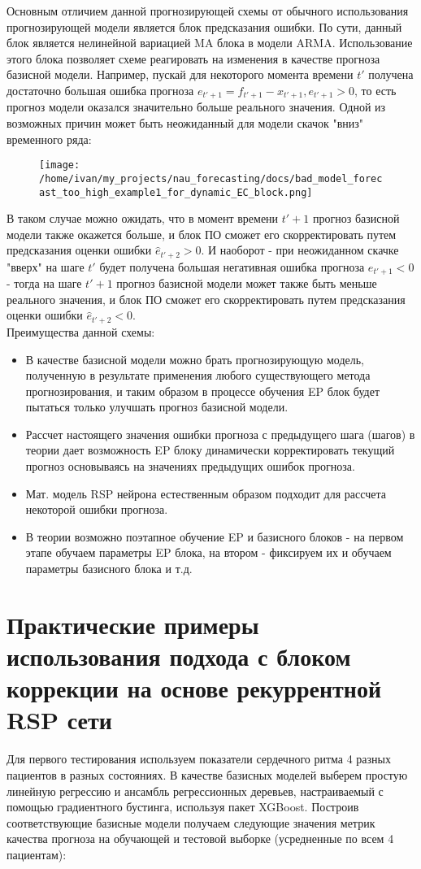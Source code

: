 \documentclass[11pt]{article}
\begin{document}
Основным отличием данной прогнозирующей схемы от обычного использования прогнозирующей модели является блок предсказания ошибки. По сути, данный блок является нелинейной вариацией MA блока в модели ARMA. Использование этого блока позволяет схеме реагировать на изменения в качестве прогноза базисной модели. Например, пускай для некоторого момента времени $t'$ получена достаточно большая ошибка прогноза $ e_{t'+1} = f_{t'+1} - x_{t'+1}, e_{t'+1} > 0 $, то есть прогноз модели оказался значительно больше реального значения. Одной из возможных причин может быть неожиданный для модели скачок "вниз" временного ряда:
\begin{figure}[H]
\centering
\texttt{[image: /home/ivan/my\_projects/nau\_forecasting/docs/bad\_model\_forecast\_too\_high\_example1\_for\_dynamic\_EC\_block.png]}
\label{}
\end{figure}

В таком случае можно ожидать, что в момент времени $t'+1$ прогноз базисной модели также окажется больше, и блок ПО сможет его скорректировать путем предсказания оценки ошибки $ \hat{e}_{t'+2} > 0$. И наоборот - при неожиданном скачке "вверх" на шаге $t'$ будет получена большая негативная ошибка прогноза $ e_{t'+1} < 0 $ - тогда на шаге $t'+1$ прогноз базисной модели может также быть меньше реального значения, и блок ПО сможет его скорректировать путем предсказания оценки ошибки $\hat{e}_{t'+2} < 0$.
\\ 
Преимущества данной схемы:
\begin{itemize}
\item В качестве базисной модели можно брать прогнозирующую модель, полученную в результате применения любого существующего метода прогнозирования, и таким образом в процессе обучения EP блок будет пытаться только улучшать прогноз базисной модели.
\item Рассчет настоящего значения ошибки прогноза с предыдущего шага (шагов) в теории дает возможность EP блоку динамически корректировать текущий прогноз основываясь на значениях предыдущих ошибок прогноза.
\item Мат. модель RSP нейрона естественным образом подходит для рассчета некоторой ошибки прогноза.
\item В теории возможно поэтапное обучение EP и базисного блоков - на первом этапе обучаем параметры EP блока, на втором - фиксируем их и обучаем параметры базисного блока и т.д.
\end{itemize}

\section*{Практические примеры использования подхода с блоком коррекции на основе рекуррентной RSP сети}
Для первого тестирования используем показатели сердечного ритма 4 разных пациентов в разных состояниях. В качестве базисных моделей выберем простую линейную регрессию и ансамбль регрессионных деревьев, настраиваемый с помощью градиентного бустинга, используя пакет XGBoost. Построив соответствующие базисные модели получаем следующие значения метрик качества прогноза на обучающей и тестовой выборке (усредненные по всем 4 пациентам):
\end{document}

